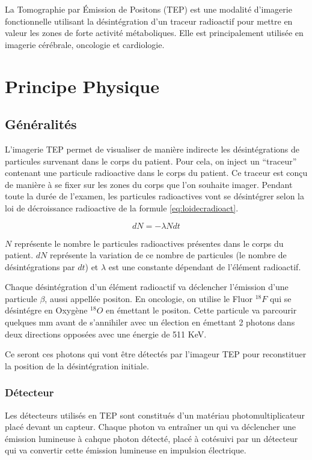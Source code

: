 La Tomographie par \'Emission de Positons (TEP) est une modalité d'imagerie fonctionnelle utilisant la désintégration d'un traceur radioactif pour mettre en valeur les zones de forte activité métaboliques. Elle est principalement utilisée en imagerie cérébrale, oncologie et cardiologie.

\chapter{Principe Physique}


	\section{Généralités}
L'imagerie TEP permet de visualiser de manière indirecte les désintégrations de particules survenant dans le corps du patient. Pour cela, on inject un ``traceur'' contenant une particule radioactive dans le corps du patient. Ce traceur est conçu de manière à se fixer sur les zones du corps que l'on souhaite imager. Pendant toute la durée de l'examen, les particules radioactives vont se désintégrer selon la loi de décroissance radioactive de la formule \ref{eq:loidecradioact}.

\begin{equation}
	dN = - \lambda N dt
	\label{eq:loidecradioact}
\end{equation}

$N$ représente le nombre le particules radioactives présentes dans le corps du patient. $dN$ représente la variation de ce nombre de particules (le nombre de désintégrations par $dt$) et $\lambda$ est une constante dépendant de l'élément radioactif.

Chaque désintégration d'un élément radioactif va déclencher l'émission d'une particule $\beta$, aussi appellée positon. En oncologie, on utilise le Fluor $^{18}F$ qui se désintégre en Oxygène $^{18}O$ en émettant le positon. Cette particule va parcourir quelques mm avant de s'annihiler avec un élection en émettant 2 photons dans deux directions opposées avec une énergie de 511 KeV.

Ce seront ces photons qui vont être détectés par l'imageur TEP pour reconstituer la position de la désintégration initiale. 
	\subsection{Détecteur}

Les détecteurs utilisés en TEP sont constitués d'un matériau photomultiplicateur placé devant un capteur. Chaque photon va entraîner un qui va déclencher une émission lumineuse à cahque photon détecté, placé à cotésuivi par un détecteur qui va convertir cette émission lumineuse en impulsion électrique. 

